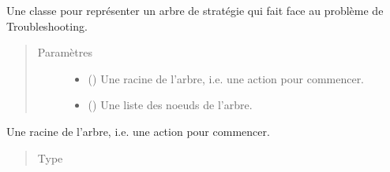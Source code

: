 \documentclass[letterpaper,10pt,french]{sphinxmanual}
\begin{document}

\begin{fulllineitems}
\label{\detokenize{index:StrategyTree.StrategyTree}}
Une classe pour représenter un arbre de stratégie qui fait face au problème de Troubleshooting.
\begin{quote}\begin{description}
\item[{Paramètres}] \leavevmode\begin{itemize}
\item {} 
 ({\hyperref[\detokenize{index:StrategyTree.NodeST}]{}}\sphinxstyleliteralemphasis{\sphinxupquote{, }}) \textendash{} Une racine de l’arbre, i.e. une action pour commencer.

\item {} 
 (\sphinxstyleliteralemphasis{\sphinxupquote{)}}\sphinxstyleliteralemphasis{\sphinxupquote{, }}) \textendash{} Une liste des noeuds de l’arbre.

\end{itemize}

\end{description}\end{quote}

\begin{fulllineitems}
\label{\detokenize{index:StrategyTree.StrategyTree._root}}
Une racine de l’arbre, i.e. une action pour commencer.
\begin{quote}\begin{description}
\item[{Type}] \leavevmode
{\hyperref[\detokenize{index:StrategyTree.NodeST}]{}}


\end{description}
\end{quote}
\end{fulllineitems}
\end{fulllineitems}
\end{document}
